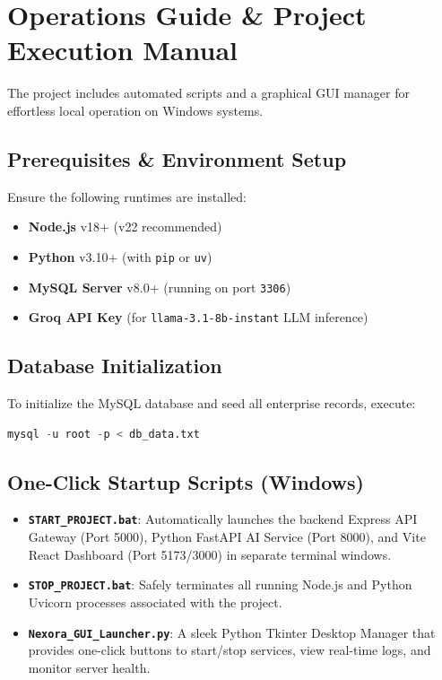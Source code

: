 \documentclass[11pt,a4paper]{article}
\begin{document}
\section{Operations Guide \& Project Execution Manual}

The project includes automated scripts and a graphical GUI manager for effortless local operation on Windows systems.

\subsection{Prerequisites \& Environment Setup}
Ensure the following runtimes are installed:
\begin{itemize}[noitemsep]
    \item \textbf{Node.js} v18+ (v22 recommended)
    \item \textbf{Python} v3.10+ (with \texttt{pip} or \texttt{uv})
    \item \textbf{MySQL Server} v8.0+ (running on port \texttt{3306})
    \item \textbf{Groq API Key} (for \texttt{llama-3.1-8b-instant} LLM inference)
\end{itemize}

\subsection{Database Initialization}
To initialize the MySQL database and seed all enterprise records, execute:
\begin{lstlisting}[language=SQL, caption=Database Seed Command]
mysql -u root -p < db_data.txt
\end{lstlisting}

\subsection{One-Click Startup Scripts (Windows)}
\begin{itemize}[leftmargin=*]
    \item \textbf{\texttt{START\_PROJECT.bat}}: Automatically launches the backend Express API Gateway (Port 5000), Python FastAPI AI Service (Port 8000), and Vite React Dashboard (Port 5173/3000) in separate terminal windows.
    \item \textbf{\texttt{STOP\_PROJECT.bat}}: Safely terminates all running Node.js and Python Uvicorn processes associated with the project.
    \item \textbf{\texttt{Nexora\_GUI\_Launcher.py}}: A sleek Python Tkinter Desktop Manager that provides one-click buttons to start/stop services, view real-time logs, and monitor server health.
\end{itemize}
\end{document}
